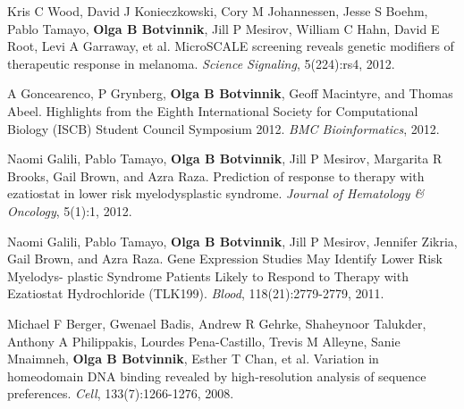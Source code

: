 \begin{frontmatter}
\begin{vitapage}
\begin{publications}
\item Kris C Wood, David J Konieczkowski, Cory M Johannessen, Jesse S Boehm, Pablo Tamayo, \textbf{Olga B Botvinnik}, Jill P Mesirov, William C Hahn, David E Root, Levi A Garraway, et al. MicroSCALE screening reveals genetic modifiers of therapeutic response in melanoma. \emph{Science Signaling}, 5(224):rs4, 2012.

\item A Goncearenco, P Grynberg, \textbf{Olga B Botvinnik}, Geoff Macintyre, and Thomas Abeel. Highlights from the Eighth International Society for Computational Biology (ISCB) Student Council Symposium 2012. \emph{BMC Bioinformatics}, 2012.

\item Naomi Galili, Pablo Tamayo, \textbf{Olga B Botvinnik}, Jill P Mesirov, Margarita R Brooks, Gail Brown, and Azra Raza. Prediction of response to therapy with ezatiostat in lower risk myelodysplastic syndrome. \emph{Journal of Hematology \& Oncology}, 5(1):1, 2012.

\item Naomi Galili, Pablo Tamayo, \textbf{Olga B Botvinnik}, Jill P Mesirov, Jennifer Zikria, Gail Brown, and Azra Raza. Gene Expression Studies May Identify Lower Risk Myelodys- plastic Syndrome Patients Likely to Respond to Therapy with Ezatiostat Hydrochloride
(TLK199). \emph{Blood}, 118(21):2779-2779, 2011.

\item Michael F Berger, Gwenael Badis, Andrew R Gehrke, Shaheynoor Talukder, Anthony A Philippakis, Lourdes Pena-Castillo, Trevis M Alleyne, Sanie Mnaimneh, \textbf{Olga B Botvinnik}, Esther T Chan, et al. Variation in homeodomain DNA binding revealed by high-resolution analysis of sequence preferences. \emph{Cell}, 133(7):1266-1276, 2008.
\end{publications}

\end{vitapage}



\end{frontmatter}
